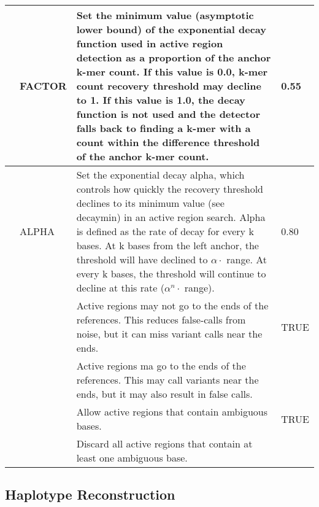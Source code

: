 \begin{small}
\begin{longtable}{|p{\optwidth}|p{\argwidth}|p{\dscwidth}|p{}|}
		\lopt{decaymin} & FACTOR &
		Set the minimum value (asymptotic lower bound) of the exponential decay function used in active region detection as a proportion of the anchor k-mer count. If this value is 0.0, k-mer count recovery threshold may decline to 1. If this value is 1.0, the decay function is not used and the detector falls back to finding a k-mer with a count within the difference threshold of the anchor k-mer count.
		& 0.55
		\\ \hline
		
		\lopt{alpha} & ALPHA &
		Set the exponential decay alpha, which controls how quickly the recovery threshold declines to its minimum value (see \ddash{}decaymin) in an active region search. Alpha is defined as the rate of decay for every k bases. At k bases from the left anchor, the threshold will have declined to $\alpha \cdot$ range. At every k bases, the threshold will continue to decline at this rate ($\alpha^n \cdot$ range).
		& 0.80
		\\ \hline
		
		\lopt{anchorboth} & &
		Active regions may not go to the ends of the references. This reduces false-calls from noise, but it can miss variant calls near the ends.
		& TRUE
		\\ \hline
		
		\lopt{noanchorboth} & &
		Active regions ma go to the ends of the references. This may call variants near the ends, but it may also result in false calls.
		&
		\\ \hline
		
		\lopt{ambiregions}  & &
		Allow active regions that contain ambiguous bases.
		& TRUE
		\\ \hline
		
		\lopt{noambigregions} & &
		Discard all active regions that contain at least one ambiguous base.
		&
		\\ \hline
		
	\end{longtable}
\end{small}



\subsection{Haplotype Reconstruction}
\label{sec.cmdline.opts.haplo}

